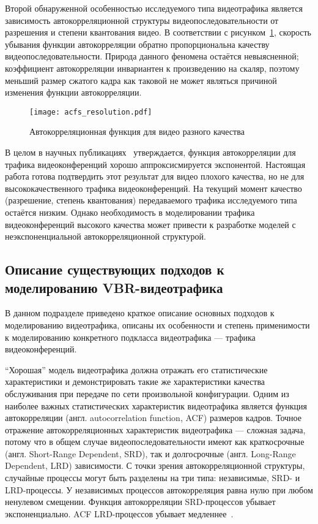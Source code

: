 Второй обнаруженной особенностью исследуемого типа видеотрафика
является зависимость автокорреляционной структуры видеопоследовательности
от разрешения и степени квантования видео. В соответствии с рисунком~\ref{fig:acfs},
скорость убывания функции автокорреляции обратно пропорциональна качеству
видеопоследовательности. Природа данного феномена остаётся невыясненной;
коэффициент автокорреляции инвариантен к произведению на скаляр,
поэтому меньший размер сжатого кадра как таковой не может являться
причиной изменения функции автокорреляции.

\begin{figure}[h]
    \begin{center}
        \texttt{[image: acfs\_resolution.pdf]}
    \end{center}
    \caption{Автокорреляционная функция для видео разного качества}
    \label{fig:acfs}
\end{figure}

В целом в научных публикациях~\cite{raey} утверждается, функция автокорреляции
для трафика видеоконференций хорошо аппроксисмируется экспонентой. Настоящая
работа готова подтвердить этот результат для видео плохого качества,
но не для высококачественного трафика видеоконференций. На текущий момент
качество (разрешение, степень квантования) передаваемого трафика исследуемого типа
остаётся низким. Однако необходимость в моделировании трафика видеоконференций
высокого качества может привести к разработке моделей с неэкспоненциальной
автокорреляционной структурой.

\newpage
\subsection{Описание существующих подходов к моделированию VBR-видеотрафика}
\label{sse:survey}

В данном подразделе приведено краткое описание основных подходов
к моделированию видеотрафика, описаны их особенности и степень
применимости к моделированию конкретного подкласса видеотрафика ---
трафика видеоконференций.

``Хорошая'' модель видеотрафика должна отражать его статистические
характеристики и демонстрировать такие же характеристики качества
обслуживания при передаче по сети произвольной конфигурации.
Одним из наиболее важных статистических характеристик
видеотрафика является функция автокорреляции (англ. autocorrelation function, ACF)
размеров кадров.
Точное отражение автокорреляционных характеристик видеотрафика ---
сложная задача, потому что в общем случае видеопоследовательности
имеют как краткосрочные (англ. Short-Range Dependent, SRD), так
и долгосрочные (англ. Long-Range Dependent, LRD) зависимости.
С точки зрения автокорреляционной структуры, случайные процессы
могут быть разделены на три типа: независимые, SRD- и LRD-процессы.
У независимых процессов автокорреляция равна нулю при любом
ненулевом смещении. Функция автокорреляции SRD-процессов
убывает экспоненциально. ACF LRD-процессов убывает медленнее~\cite{raey}.

